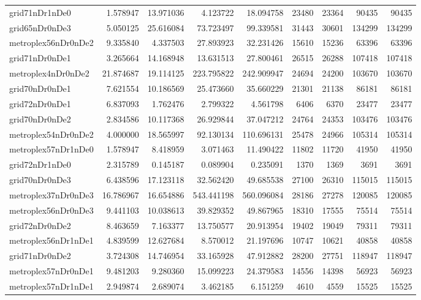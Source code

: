 \begin{longtable}{|l|r|r|r|r|r|r|r|r|}
grid71nDr1nDe0 & 1.578947 & 13.971036 & 4.123722 & 18.094758 & 23480 & 23364 & 90435 & 90435 \\
grid65nDr0nDe3 & 5.050125 & 25.616084 & 73.723497 & 99.339581 & 31443 & 30601 & 134299 & 134299 \\
metroplex56nDr0nDe2 & 9.335840 & 4.337503 & 27.893923 & 32.231426 & 15610 & 15236 & 63396 & 63396 \\
grid71nDr0nDe1 & 3.265664 & 14.168948 & 13.631513 & 27.800461 & 26515 & 26288 & 107418 & 107418 \\
metroplex4nDr0nDe2 & 21.874687 & 19.114125 & 223.795822 & 242.909947 & 24694 & 24200 & 103670 & 103670 \\
grid70nDr0nDe1 & 7.621554 & 10.186569 & 25.473660 & 35.660229 & 21301 & 21138 & 86181 & 86181 \\
grid72nDr0nDe1 & 6.837093 & 1.762476 & 2.799322 & 4.561798 & 6406 & 6370 & 23477 & 23477 \\
grid70nDr0nDe2 & 2.834586 & 10.117368 & 26.929844 & 37.047212 & 24764 & 24353 & 103476 & 103476 \\
metroplex54nDr0nDe2 & 4.000000 & 18.565997 & 92.130134 & 110.696131 & 25478 & 24966 & 105314 & 105314 \\
metroplex57nDr1nDe0 & 1.578947 & 8.418959 & 3.071463 & 11.490422 & 11802 & 11720 & 41950 & 41950 \\
grid72nDr1nDe0 & 2.315789 & 0.145187 & 0.089904 & 0.235091 & 1370 & 1369 & 3691 & 3691 \\
grid70nDr0nDe3 & 6.438596 & 17.123118 & 32.562420 & 49.685538 & 27100 & 26310 & 115015 & 115015 \\
metroplex37nDr0nDe3 & 16.786967 & 16.654886 & 543.441198 & 560.096084 & 28186 & 27278 & 120085 & 120085 \\
metroplex56nDr0nDe3 & 9.441103 & 10.038613 & 39.829352 & 49.867965 & 18310 & 17555 & 75514 & 75514 \\
grid72nDr0nDe2 & 8.463659 & 7.163377 & 13.750577 & 20.913954 & 19402 & 19049 & 79311 & 79311 \\
metroplex56nDr1nDe1 & 4.839599 & 12.627684 & 8.570012 & 21.197696 & 10747 & 10621 & 40858 & 40858 \\
grid71nDr0nDe2 & 3.724308 & 14.746954 & 33.165928 & 47.912882 & 28200 & 27751 & 118947 & 118947 \\
metroplex57nDr0nDe1 & 9.481203 & 9.280360 & 15.099223 & 24.379583 & 14556 & 14398 & 56923 & 56923 \\
metroplex57nDr1nDe1 & 2.949874 & 2.689074 & 3.462185 & 6.151259 & 4610 & 4559 & 15525 & 15525 \\

\end{longtable}
